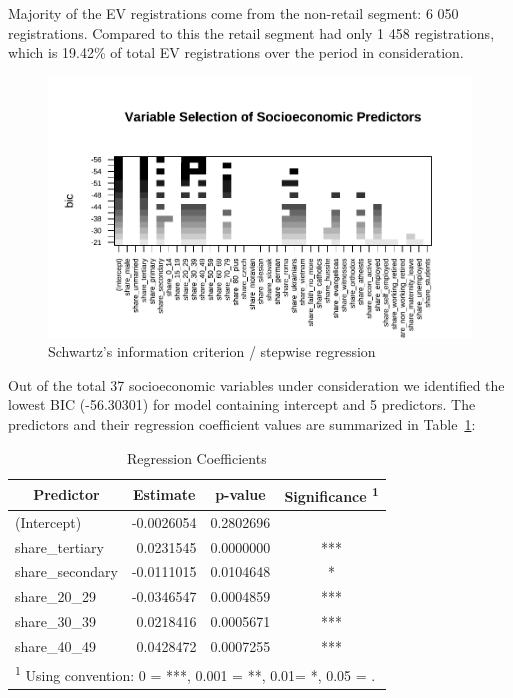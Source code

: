 \documentclass{mmeproc}
\begin{document}
Majority of the EV registrations come from the non-retail segment: 6 050
registrations. Compared to this the retail segment had only 1 458
registrations, which is 19.42\% of total EV registrations over the
period in consideration.

\begin{figure}[H]

{\centering \includegraphics{jla-submission_files/figure-pdf/fig-stepwise-1.pdf}

}

\caption{\label{fig-stepwise}Schwartz's information criterion / stepwise
regression}

\end{figure}

Out of the total 37 socioeconomic variables under consideration we
identified the lowest BIC (-56.30301) for model containing intercept and
5 predictors. The predictors and their regression coefficient values are
summarized in Table~\ref{tbl-coeffs}:

\hypertarget{tbl-coeffs}{}
\begin{table}[H]
\centering
\begin{tabular}{lrrc}
\toprule
\multicolumn{1}{c}{\textbf{Predictor}} & \multicolumn{1}{c}{\textbf{Estimate}} & \multicolumn{1}{c}{\textbf{p-value}} & \multicolumn{1}{c}{\textbf{Significance \textsuperscript{1}}}\\
\midrule
(Intercept) & -0.0026054 & 0.2802696 & \\
share\_tertiary & 0.0231545 & 0.0000000 & ***\\
share\_secondary & -0.0111015 & 0.0104648 & *\\
share\_20\_29 & -0.0346547 & 0.0004859 & ***\\
share\_30\_39 & 0.0218416 & 0.0005671 & ***\\
share\_40\_49 & 0.0428472 & 0.0007255 & ***\\
\bottomrule
\multicolumn{4}{l}{\rule{0pt}{1em}\textsuperscript{1} Using convention: 0 = ***, 0.001 = **, 0.01=  *, 0.05 = .}\\
\end{tabular}
\caption{\label{tbl-coeffs}Regression Coefficients }\tabularnewline
\end{table}
\end{document}
